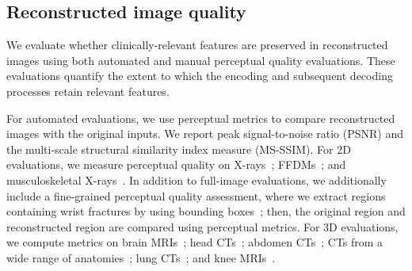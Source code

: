\subsection{Reconstructed image quality}

We evaluate whether clinically-relevant features are preserved in reconstructed images using both automated and manual perceptual quality evaluations. These evaluations quantify the extent to which the encoding and subsequent decoding processes retain relevant features.

For automated evaluations, we use perceptual metrics to compare reconstructed images with the original inputs. We report peak signal-to-noise ratio (PSNR) and the multi-scale structural similarity index measure (MS-SSIM). For 2D evaluations, we measure perceptual quality on X-rays~\cite{feng2021candid,johnson2019mimic}; FFDMs~\cite{jeong2022emory,sorkhei2021csaw,rsnamammo,nguyen2022vindrmammo,moreira2012inbreast,cai2023online}; and musculoskeletal X-rays~\cite{Nagy2022wristfrac}. In addition to full-image evaluations, we additionally include a fine-grained perceptual quality assessment, where we extract regions containing wrist fractures by using bounding boxes~\cite{Nagy2022wristfrac}; then, the original region and reconstructed region are compared using perceptual metrics. For 3D evaluations, we compute metrics on brain MRIs~\cite{jack2008alzheimer,dagley2017harvard,insel2020a4,lamontagne2019oasis}; head CTs~\cite{chilamkurthy2018development}; abdomen CTs~\cite{ji2022amos}; CTs from a wide range of anatomies~\cite{wasserthal2023totalsegmentator}; lung CTs~\cite{armato2011lung}; and knee MRIs~\cite{bien2018deep}.


